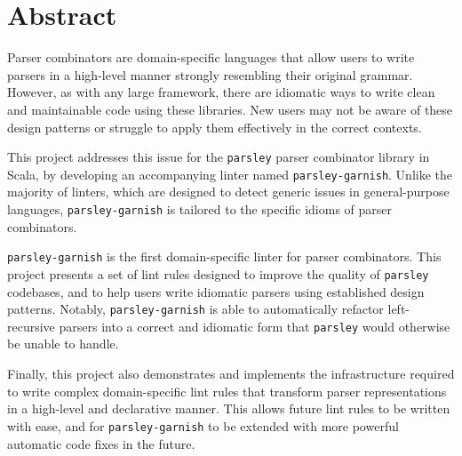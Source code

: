 \documentclass[../../main.tex]{subfiles}
\begin{document}
\hspace{0pt}
\vfill
\section*{\centering Abstract}
\noindent
Parser combinators are domain-specific languages that allow users to write parsers in a high-level manner strongly resembling their original grammar.
However, as with any large framework, there are idiomatic ways to write clean and maintainable code using these libraries.
New users may not be aware of these design patterns or struggle to apply them effectively in the correct contexts.

\noindent
This project addresses this issue for the \texttt{parsley} parser combinator library in Scala, by developing an accompanying linter named \texttt{parsley-garnish}.
Unlike the majority of linters, which are designed to detect generic issues in general-purpose languages, \texttt{parsley-garnish} is tailored to the specific idioms of parser combinators.

\noindent
\texttt{parsley-garnish} is the first domain-specific linter for parser combinators.
This project presents a set of lint rules designed to improve the quality of \texttt{parsley} codebases, and to help users write idiomatic parsers using established design patterns.
Notably, \texttt{parsley-garnish} is able to automatically refactor left-recursive parsers into a correct and idiomatic form that \texttt{parsley} would otherwise be unable to handle.

\noindent
Finally, this project also demonstrates and implements the infrastructure required to write complex domain-specific lint rules that transform parser representations in a high-level and declarative manner.
This allows future lint rules to be written with ease, and for \texttt{parsley-garnish} to be extended with more powerful automatic code fixes in the future.
\vfill
\hspace{0pt}
\end{document}
